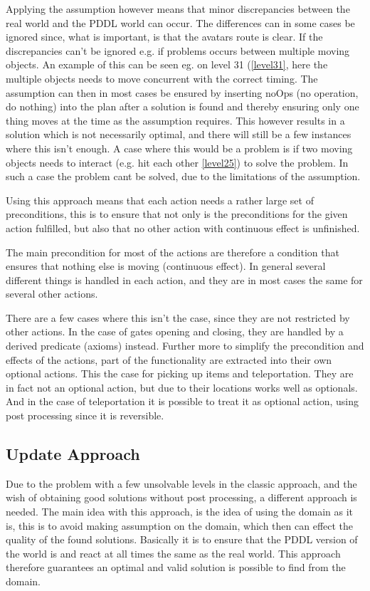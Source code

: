 		Applying the assumption however means that minor discrepancies between the real world and the PDDL world can occur. The differences can in some cases be ignored since, what is important, is that the avatars route is clear. If the discrepancies can't be ignored e.g. if problems occurs between multiple moving objects. An example of this can be seen eg. on level 31 (\ref{level31}, here the multiple objects needs to move concurrent with the correct timing. The assumption can then in most cases be ensured by inserting noOps (no operation, do nothing) into the plan after a solution is found and thereby ensuring only one thing moves at the time as the assumption requires. 
		This however results in a solution which is not necessarily optimal, and there will still be a few instances where this isn't enough. A case where this would be a problem is if two moving objects needs to interact (e.g. hit each other \ref{level25}) to solve the problem. In such a case the problem cant be solved, due to the limitations of the assumption.
			
		Using this approach means that each action needs a rather large set of preconditions, this is to ensure that not only is the preconditions for the given action fulfilled, but also that no other action with continuous effect is unfinished. 

		The main precondition for most of the actions are therefore a condition that ensures that nothing else is moving (continuous effect). In general several different things is handled in each action, and they are in most cases the same for several other actions. %
		
		There are a few cases where this isn't the case, since they are not restricted by other actions. In the case of gates opening and closing, they are handled by a derived predicate (axioms) instead. 
		Further more to simplify the precondition and effects of the actions, part of the functionality are extracted into their own optional actions. This the case for picking up items and teleportation. They are in fact not an optional action, but due to their locations works well as optionals. And in the case of teleportation it is possible to treat it as optional action, using post processing since it is reversible.
		
		\subsection{Update Approach}
		Due to the problem with a few unsolvable levels in the classic approach, and the wish of obtaining good solutions without post processing, a different approach is needed. The main idea with this approach, is the idea of using the domain as it is, this is to avoid making assumption on the domain, which then can effect the quality of the found solutions. Basically it is to ensure that the PDDL version of the world is and react at all times the same as the real world. This approach therefore guarantees an optimal and valid solution is possible to find from the domain.
		
